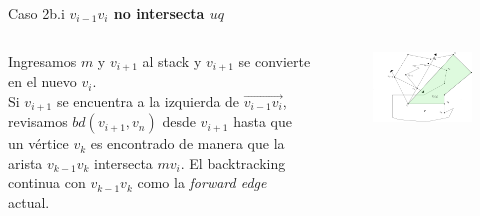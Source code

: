 \documentclass[aspectratio=169,xcolor=dvipsnames, t]{beamer}
\begin{document}

\begin{frame}{Caso 2b.i}
    \textbf{$v_{i-1}v_{i}$ no intersecta $uq$}\\
    \vspace{0.5cm}
    \begin{columns}
    \begin{column}{0.45\textwidth}
    Ingresamos $m$ y $v_{i+1}$ al stack y $v_{i+1}$ se convierte en el nuevo $v_{i}$.\\
    \vspace{0.5cm}
    Si $v_{i+1}$ se encuentra a la izquierda de $\overrightarrow{v_{i-1}v_{i}}$, revisamos $bd(v_{i+1}, v_{n})$ desde $v_{i+1}$ hasta que un vértice $v_{k}$ es encontrado de manera que la arista $v_{k-1}v_{k}$ intersecta $mv_{i}$. El backtracking continua con $v_{k-1}v_{k}$ como la \textit{forward edge} actual.    
    \end{column}
    \begin{column}{0.45\textwidth}  %
    \vspace{-1.5cm}
        \begin{figure}
            \centering
            \includegraphics[width=1.1\textwidth]{imagenes/Caso2.6b.png}
        \end{figure}
    \end{column}
    \end{columns}
\end{frame}

\end{document}
